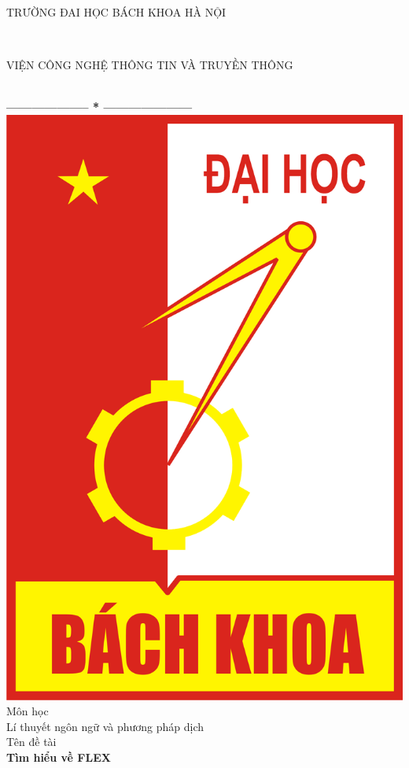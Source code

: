 \documentclass[14pt,a4paper]{extreport}
\begin{document}
	\thispagestyle{empty}
\thisfancypage{
	\setlength{\fboxsep}{10pt}
	\fbox}{}
\begin{center}
	\begin{large}
		TRƯỜNG ĐAI HỌC BÁCH KHOA HÀ NỘI
	\end{large} \\
	\begin{large}
		VIỆN CÔNG NGHỆ THÔNG TIN VÀ TRUYỀN THÔNG
	\end{large} \\
	
	\textbf{--------------------  *  ---------------------}\\[1.5cm]
	\includegraphics[scale=0.25]{12}
	\\
	\vspace{1.5cm}
	{\fontsize{17pt}{1}\selectfont  Môn học}\\[0.3cm]
	{\fontsize{20pt}{1}\selectfont 	Lí thuyết ngôn ngữ và phương pháp dịch}\\[0.9cm]
	{\fontsize{17pt}{1}\selectfont  Tên đề tài}\\[0.5cm]
	{\fontsize{23pt}{1}\selectfont \textbf{Tìm hiểu về FLEX}}\\[1.3cm]
\end{center}
\end{document}
